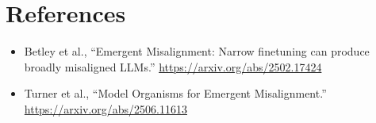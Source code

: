 \documentclass[11pt]{article}
\begin{document}
\section{References}

\begin{itemize}[leftmargin=*]
    \item Betley et al., ``Emergent Misalignment: Narrow finetuning can produce
    broadly misaligned LLMs.''
    \url{https://arxiv.org/abs/2502.17424}
    \item Turner et al., ``Model Organisms for Emergent Misalignment.''
    \url{https://arxiv.org/abs/2506.11613}
\end{itemize}
\end{document}
